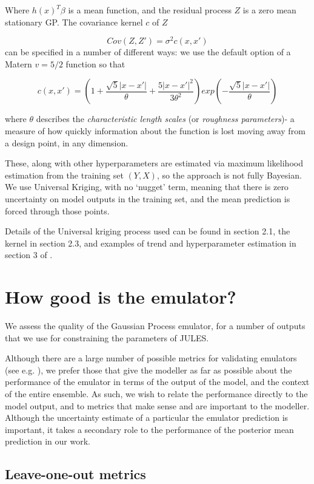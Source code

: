\documentclass[gmd, manuscript]{copernicus}
\begin{document}
Where $h(x)^T \beta$ is a mean function, and the residual process $Z$ is a zero mean stationary GP. The covariance kernel $c$ of $Z$ 

$$
Cov(Z, Z') = \sigma^2 c(x,x')
$$
can be specified in a number of different ways: we use the default option of a Matern $v=5/2$ function so that

$$
c(x,x') = (1 + \frac{\sqrt{5} | x - x'|}{\theta} + \frac{5 | x - x'|^2}{3 \theta^2})exp(- \frac{\sqrt{5} |x-x'|}{\theta})
$$

where $\theta$ describes the \emph{characteristic length scales} (or \emph{roughness parameters})- a measure of how quickly information about the function is lost moving away from a design point, in any dimension. 

These, along with other hyperparameters are estimated via maximum likelihood estimation from the training set $(Y, X)$, so the approach is not fully Bayesian. We use Universal Kriging, with no `nugget' term, meaning that there is zero uncertainty on model outputs in the training set, and the mean prediction is forced through those points. 

Details of the Universal kriging process used can be found in section 2.1, the kernel in section 2.3, and examples of trend and hyperparameter estimation in section 3 of \cite{roustant2012dicekriging}. 


\section{How good is the emulator?}\label{app:emulator_accuracy}    %

We assess the quality of the Gaussian Process emulator, for a number of outputs that we use for constraining the parameters of JULES.

Although there are a large number of possible metrics  for validating emulators (see e.g. \cite{al2018diagnostics}), we prefer those that give the modeller as far as possible about the performance of the emulator in terms of the output of the model, and the context of the entire ensemble. As such, we wish to relate the performance directly to the model output, and to metrics that make sense and are important to the modeller. Although the uncertainty estimate of a particular the emulator prediction is important, it takes a secondary role to the performance of the posterior mean prediction in our work.

\subsection{Leave-one-out metrics}\label{app:leave_one_out}     %
\end{document}
